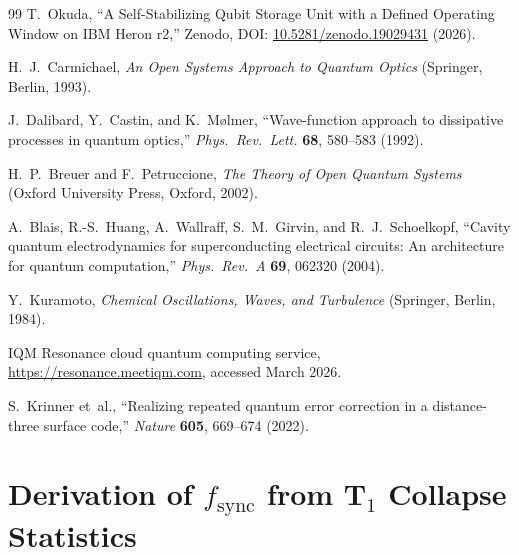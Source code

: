 \documentclass[10pt,twocolumn]{article}
\begin{document}
\begin{thebibliography}{99}
T.~Okuda,
``A Self-Stabilizing Qubit Storage Unit with a Defined Operating Window
on IBM Heron r2,''
Zenodo, DOI: \href{https://doi.org/10.5281/zenodo.19029431}%
{10.5281/zenodo.19029431} (2026).

H.~J.~Carmichael,
\textit{An Open Systems Approach to Quantum Optics}
(Springer, Berlin, 1993).

J.~Dalibard, Y.~Castin, and K.~M{\o}lmer,
``Wave-function approach to dissipative processes in quantum optics,''
\textit{Phys.\ Rev.\ Lett.} \textbf{68}, 580--583 (1992).

H.~P.~Breuer and F.~Petruccione,
\textit{The Theory of Open Quantum Systems}
(Oxford University Press, Oxford, 2002).

A.~Blais, R.-S.~Huang, A.~Wallraff, S.~M.~Girvin, and R.~J.~Schoelkopf,
``Cavity quantum electrodynamics for superconducting electrical circuits:
An architecture for quantum computation,''
\textit{Phys.\ Rev.\ A} \textbf{69}, 062320 (2004).

Y.~Kuramoto,
\textit{Chemical Oscillations, Waves, and Turbulence}
(Springer, Berlin, 1984).

IQM Resonance cloud quantum computing service,
\url{https://resonance.meetiqm.com}, accessed March 2026.

S.~Krinner et~al.,
``Realizing repeated quantum error correction in a distance-three surface code,''
\textit{Nature} \textbf{605}, 669--674 (2022).

\end{thebibliography}


\appendix

\section{Derivation of \texorpdfstring{$f_\mathrm{sync}$}{f\_sync} from T\texorpdfstring{$_1$}{1} Collapse Statistics}
\label{app:fsync}
\end{document}
